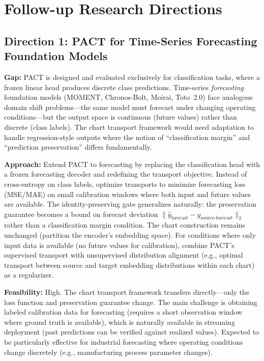 \documentclass[11pt,a4paper]{article}
\begin{document}
\section{Follow-up Research Directions}

\subsection{Direction 1: PACT for Time-Series Forecasting Foundation Models}
\textbf{Gap:} PACT is designed and evaluated exclusively for classification tasks, where a frozen linear head produces discrete class predictions. Time-series \emph{forecasting} foundation models (MOMENT, Chronos-Bolt, Moirai, Toto~2.0) face analogous domain shift problems---the same model must forecast under changing operating conditions---but the output space is continuous (future values) rather than discrete (class labels). The chart transport framework would need adaptation to handle regression-style outputs where the notion of ``classification margin'' and ``prediction preservation'' differs fundamentally.

\textbf{Approach:} Extend PACT to forecasting by replacing the classification head with a frozen forecasting decoder and redefining the transport objective. Instead of cross-entropy on class labels, optimize transports to minimize forecasting loss (MSE/MAE) on small calibration windows where both input and future values are available. The identity-preserving gate generalizes naturally: the preservation guarantee becomes a bound on forecast deviation $\|\hat{y}_{\text{forecast}} - y_{\text{source-forecast}}\|_2$ rather than a classification margin condition. The chart construction remains unchanged (partition the encoder's embedding space). For conditions where only input data is available (no future values for calibration), combine PACT's supervised transport with unsupervised distribution alignment (e.g., optimal transport between source and target embedding distributions within each chart) as a regularizer.

\textbf{Feasibility:} High. The chart transport framework transfers directly---only the loss function and preservation guarantee change. The main challenge is obtaining labeled calibration data for forecasting (requires a short observation window where ground truth is available), which is naturally available in streaming deployment (past predictions can be verified against realized values). Expected to be particularly effective for industrial forecasting where operating conditions change discretely (e.g., manufacturing process parameter changes).
\end{document}
